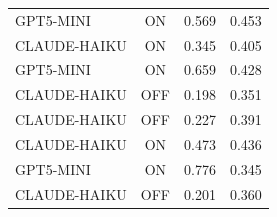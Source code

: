 \begin{table}[t]
\begin{tabular}{lccc}
GPT5-MINI & ON  & 0.569 & 0.453 \\
CLAUDE-HAIKU & ON  & 0.345 & 0.405 \\
GPT5-MINI & ON  & 0.659 & 0.428 \\
CLAUDE-HAIKU & OFF & 0.198 & 0.351 \\
CLAUDE-HAIKU & OFF & 0.227 & 0.391 \\
CLAUDE-HAIKU & ON  & 0.473 & 0.436 \\
GPT5-MINI & ON  & 0.776 & 0.345 \\
CLAUDE-HAIKU & OFF & 0.201 & 0.360 \\
\bottomrule
\end{tabular}
\end{table}








